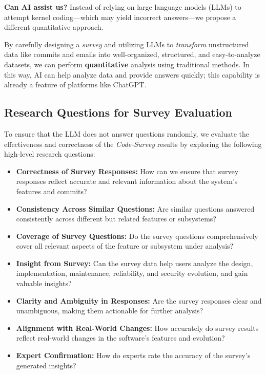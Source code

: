 \textbf{Can AI assist us?} Instead of relying on large language models (LLMs) to attempt kernel coding—which may yield incorrect answers—we propose a different quantitative approach.

By carefully designing a \emph{survey} and utilizing LLMs to \emph{transform} unstructured data like commits and emails into well-organized, structured, and easy-to-analyze datasets, we can perform \textbf{quantitative} analysis using traditional methods. In this way, AI can help analyze data and provide answers quickly; this capability is already a feature of platforms like ChatGPT.

\subsection{Research Questions for Survey Evaluation}

To ensure that the LLM does not answer questions randomly, we evaluate the effectiveness and correctness of the \emph{Code-Survey} results by exploring the following high-level research questions:

\begin{itemize}
    \item \textbf{Correctness of Survey Responses:} How can we ensure that survey responses reflect accurate and relevant information about the system's features and commits?
    \item \textbf{Consistency Across Similar Questions:} Are similar questions answered consistently across different but related features or subsystems?
    \item \textbf{Coverage of Survey Questions:} Do the survey questions comprehensively cover all relevant aspects of the feature or subsystem under analysis?
    \item \textbf{Insight from Survey:} Can the survey data help users analyze the design, implementation, maintenance, reliability, and security evolution, and gain valuable insights?
    \item \textbf{Clarity and Ambiguity in Responses:} Are the survey responses clear and unambiguous, making them actionable for further analysis?
    \item \textbf{Alignment with Real-World Changes:} How accurately do survey results reflect real-world changes in the software's features and evolution?
    \item \textbf{Expert Confirmation:} How do experts rate the accuracy of the survey's generated insights?
\end{itemize}

